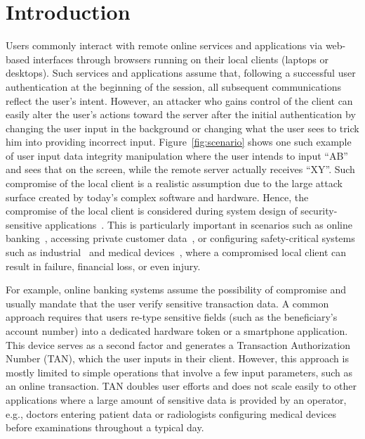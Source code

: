 \documentclass[sigconf, anonymous, balance=false]{acmart}
\newcommand{\sysname}{\textsc{IntegriScreen}\xspace}
\begin{document}
\maketitle



\section{Introduction}
\label{sec:intro}

Users commonly interact with remote online services and applications via web-based interfaces through browsers running on their local clients (laptops or desktops). Such services and applications assume that, following a successful user authentication at the beginning of the session, all subsequent communications reflect the user's intent. However, an attacker who gains control of the client can easily alter the user's actions toward the server after the initial authentication by changing the user input in the background or changing what the user sees to trick him into providing incorrect input. Figure~\ref{fig:scenario} shows one such example of user input data integrity manipulation where the user intends to input ``AB'' and sees that on the screen, while the remote server actually receives ``XY''. Such compromise of the local client is a realistic assumption due to the large attack surface created by today's complex software and hardware. Hence, the compromise of the local client is considered during system design of security-sensitive applications~\cite{EUAgencyAssumeHostCompromised}. This is particularly important in scenarios such as online banking~\cite{binsalleeh2010analysis}, accessing private customer data~\cite{uberHack}, or %
configuring safety-critical systems such as industrial~\cite{sadeghi2015security} and medical devices~\cite{ImplantsSecurity}, where a compromised local client can result in failure, financial loss, or even injury.


For example, online banking systems assume the possibility of compromise and usually mandate that the user verify sensitive transaction data.
A common approach requires that users re-type sensitive fields (such as the beneficiary's account number) into a dedicated hardware token or a smartphone application.
This device serves as a second factor and generates a Transaction Authorization Number (TAN), which the user inputs in their client. %
However, this approach is mostly limited to simple operations that involve a few input parameters, such as an online transaction. TAN doubles user efforts and does not scale easily to other applications where a large amount of sensitive data is provided by an operator, e.g., doctors entering patient data or radiologists configuring medical devices before examinations throughout a typical day.
\end{document}
